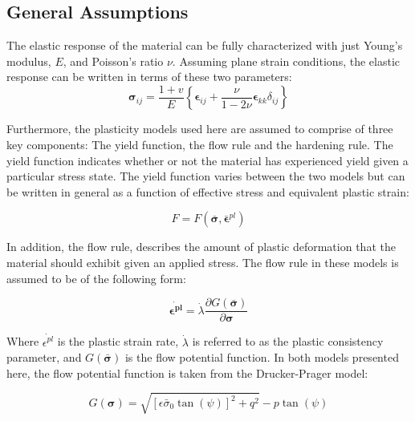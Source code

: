 \subsection{General Assumptions}
The elastic response of the material can be fully characterized with just Young's modulus, $E$, and Poisson's ratio $\nu$. Assuming plane strain conditions, the elastic response can be written in terms of these two parameters:
\begin{equation}
\boldsymbol{\sigma}_{ij}=\frac{1+v}{E}\left\{\boldsymbol{\epsilon}_{ij}+\frac{\nu}{1-2\nu}\boldsymbol{\epsilon}_{kk}\delta_{ij}\right\}
\label{eqn:const8a}
\end{equation}

Furthermore, the plasticity models used here are assumed to comprise of three key components: The yield function, the flow rule and the hardening rule. The yield function indicates whether or not the material has experienced yield given a particular stress state. The yield function varies between the two models but can be written in general as a function of effective stress and equivalent plastic strain:

\begin{equation}
    F = 
    F
    \left(
        \boldsymbol{\bar{\sigma}},\bar{\boldsymbol{\epsilon}}^{pl}
    \right)
\label{eqn:const8c}
\end{equation}

In addition, the flow rule, describes the amount of plastic deformation that the material should exhibit given an applied stress. The flow rule in these models is assumed to be of the following form:

\begin{equation}
\dot{\boldsymbol{\epsilon^{pl}}}=\dot{\lambda} \frac{\partial G\left(\bar{\boldsymbol{\sigma}}\right)}{\partial \boldsymbol{\sigma}}
\label{eqn:const8b}
\end{equation}

Where $\dot{\epsilon^{pl}}$ is the plastic strain rate, $\dot{\lambda}$ is referred to as the plastic consistency parameter, and $G\left(\bar{\boldsymbol{\sigma}}\right)$ is the flow potential function. In both models presented here, the flow potential function is taken from the Drucker-Prager model:

\begin{equation}
G\left(\boldsymbol{\sigma}\right)=\sqrt{\left[\epsilon\bar{\sigma}_{0}\tan\left(\psi\right)\right]^{2}+q^{2}}-p\tan\left(\psi\right)\label{eqn:const11}
\end{equation}

